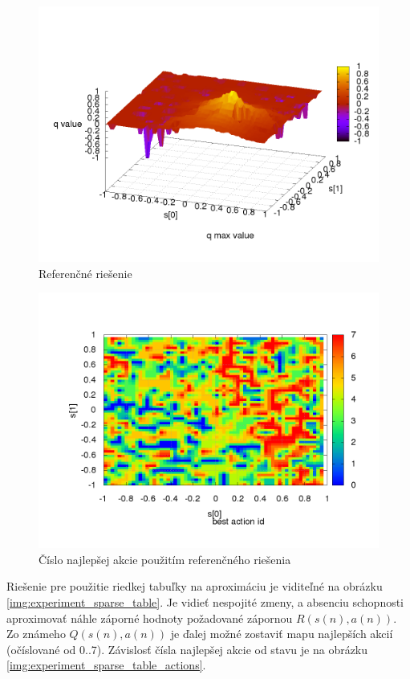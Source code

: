 \begin{figure}[!htb]
\centering
\includegraphics[scale=.4]{../../results_q_learning/map_2/function_type_0/iterations_10/q_learning_result.png}
\caption{Referenčné riešenie}
\label{img:experiment_reference}
\end{figure}

\begin{figure}[!htb]
\centering
\includegraphics[scale=.4]{../../results_q_learning/map_2/function_type_0/iterations_10/action_best_value_log_surface.png}
\caption{Číslo najlepšej akcie použitím referenčného riešenia}
\label{img:experiment_reference_action}
\end{figure}

\newpage
Riešenie pre použitie riedkej tabuľky na aproximáciu je viditeľné na obrázku \ref{img:experiment_sparse_table}.
Je vidieť nespojité zmeny, a absenciu schopnosti aproximovať náhle záporné hodnoty požadované zápornou
$R(s(n), a(n))$. Zo známeho $Q(s(n), a(n))$ je ďalej možné zostaviť mapu najlepších akcií (očíslované od
0..7). Závislosť čísla najlepšej akcie od stavu je na obrázku \ref{img:experiment_sparse_table_actions}.


